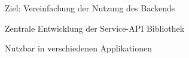 \begin{frame}

\begin{block}{}
	Ziel: Vereinfachung der Nutzung des Backends
\end{block}
\begin{block}{}
	Zentrale Entwicklung der Service-API Bibliothek
\end{block}
\begin{block}{}
	Nutzbar in verschiedenen Applikationen
\end{block}

\end{frame}